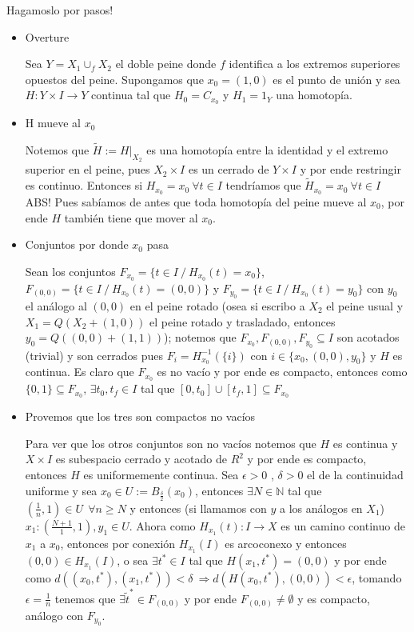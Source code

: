 \documentclass[11pt]{article}
\newcommand{\N}{{\mathbb{N}}}
\newenvironment{proof}[1][Demostraci\'on]{\begin{trivlist}
\item[\hskip \labelsep {\bfseries #1}]}{\end{trivlist}}
\begin{document}
\begin{enumerate}
\begin{proof}
\item Hagamoslo por pasos!
\begin{itemize}

\item {Overture}

Sea $Y = X_1 \cup_f X_2$ el doble peine donde $f$ identifica a los extremos superiores opuestos del peine. Supongamos que $x_0 = (1,0)$ es el punto de uni\'on y sea $H:Y \times I \rightarrow Y$ continua tal que $H_0 = C_{x_0}$ y $H_1 = 1_Y$ una homotop\'ia. 

\item {H mueve al $x_0$}

Notemos que $\tilde{H}:=H|_{X_2}$ es una homotop\'ia entre la identidad y el extremo superior en el peine, pues $X_2 \times I$ es un cerrado de $Y \times I$ y por ende restringir es continuo. Entonces si $H_{x_0}=x_0 \ \forall t \in I$ tendr\'iamos que $\tilde{H}_{x_0}=x_0 \ \forall t \in I$ ABS! Pues sab\'iamos de antes que toda homotop\'ia del peine mueve al $x_0$, por ende $H$ tambi\'en tiene que mover al $x_0$. 

\item {Conjuntos por donde $x_0$ pasa}

Sean los conjuntos $F_{x_0} = \{t \in I \ / \ H_{x_0}(t)=x_0\}$, $F_{(0,0)}=\{t \in I \ / \ H_{x_0}(t)=(0,0)\}$ y $F_{y_0}=\{t \in I \ / \ H_{x_0}(t)=y_0\}$ con $y_0$ el an\'alogo al $(0,0)$ en el peine rotado (osea si escribo a $X_2$ el peine usual y $X_1=Q(X_2+(1,0))$ el peine rotado y trasladado, entonces $y_0 = Q((0,0)+(1,1))$); notemos que $F_{x_0},F_{(0,0)},F_{y_0} \subseteq I$ son acotados (trivial) y son cerrados pues $F_{i}=H_{x_0}^{-1}(\{i\})$ con $i \in \{x_0,(0,0),y_0\}$ y $H$ es continua. Es claro que $F_{x_0}$ es no vac\'io y por ende es compacto, entonces como $\{0,1\} \subseteq F_{x_0}$, $\exists t_0,t_f \in I $ tal que $[0,t_0] \cup [t_f,1] \subseteq F_{x_0}$

\item{Provemos que los tres son compactos no vac\'ios}

Para ver que los otros conjuntos son no vac\'ios notemos que $H$ es continua y $X \times I$ es subespacio cerrado y acotado de $R^{2}$ y por ende es compacto, entonces $H$ es uniformemente continua. Sea $\epsilon > 0$ , $\delta > 0$ el de la continuidad uniforme y sea $x_0 \in U:=B_{\frac{\delta}{2}}(x_0)$, entonces $\exists N \in \N$ tal que $(\frac{1}{n},1) \in U \ \ \forall n \geq N$ y entonces (si llamamos con $y$ a los an\'alogos en $X_1$) $x_1:(\frac{N+1}{1},1),y_1 \in U$. Ahora como $H_{x_1}(t):I \rightarrow X$ es un camino continuo de $x_1$ a $x_0$, entonces por conexi\'on $H_{x_1}(I)$ es arcoconexo y entonces $(0,0) \in H_{x_1}(I)$, o sea $\exists t^* \in I$ tal que $H(x_1,t^*)=(0,0)$ y por ende como $d((x_0,t^*),(x_1,t^*)) < \delta \ \Longrightarrow d(H(x_0,t^*),(0,0)) < \epsilon$, tomando $\epsilon = \frac{1}{n}$ tenemos que $\exists \tilde{t}^* \in F_{(0,0)}$ y por ende $F_{(0,0)} \neq \emptyset$ y es compacto, an\'alogo con $F_{y_0}$.


\end{itemize}
\end{proof}
\end{enumerate}
\end{document}
